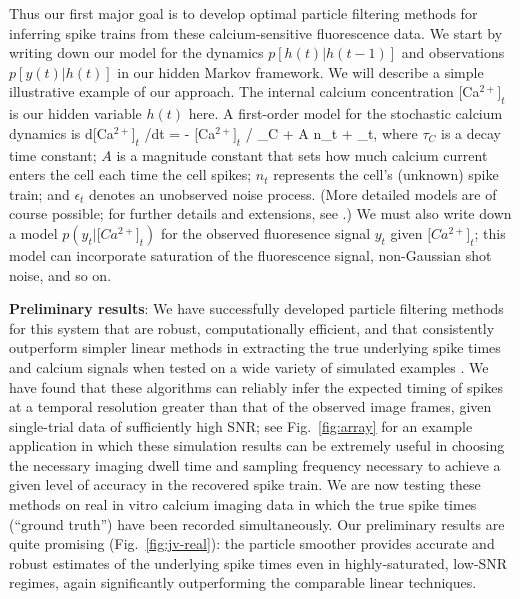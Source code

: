 \documentclass[12pt]{article}
\newcommand{\Cat}{[Ca\ensuremath{^{2+}]_t} }
\begin{document}
Thus our first major goal is to develop optimal particle filtering
methods for inferring spike trains from these calcium-sensitive
fluorescence data.  We start by writing down our model for the
dynamics $p[h(t)|h(t-1)]$ and observations $p[y(t)|h(t)]$ in our
hidden Markov framework.  We will describe a simple illustrative
example of our approach.  The internal calcium concentration \Cat is
our hidden variable $h(t)$ here.  A first-order model for the
stochastic calcium dynamics is \eq d\Cat /dt = - \Cat / \tau_C + A n_t
+ \epsilon_t, \en where $\tau_C$ is a decay time constant; $A$ is a
magnitude constant that sets how much calcium current enters the cell
each time the cell spikes; $n_t$ represents the cell's (unknown) spike
train; and $\epsilon_t$ denotes an unobserved noise process.  (More
detailed models are of course possible; for further details and
extensions, see \cite{Vogelstein07}.)  We must also write down a model
$p(y_t | \Cat)$ for the observed fluoresence signal $y_t$ given
$\Cat$; this model can incorporate saturation of the fluorescence
signal, non-Gaussian shot noise, and so on.

\noindent \textbf{Preliminary results}: We have successfully developed
particle filtering methods for this system that are robust,
computationally efficient, and that consistently outperform simpler
linear methods in extracting the true underlying spike times and
calcium signals when tested on a wide variety of simulated examples
\cite{Vogelstein07}.  We have found that these algorithms can reliably
infer the expected timing of spikes at a temporal resolution greater
than that of the observed image frames, given single-trial data of
sufficiently high SNR; see Fig.~\ref{fig:array} for an example
application in which these simulation results can be extremely useful
in choosing the necessary imaging dwell time and sampling frequency
necessary to achieve a given level of accuracy in the recovered spike
train.  We are now testing these methods on real in vitro calcium
imaging data in which the true spike times (``ground truth'') have
been recorded simultaneously.  Our preliminary results are quite
promising (Fig.~\ref{fig:jv-real}): the particle smoother provides
accurate and robust estimates of the underlying spike times even in
highly-saturated, low-SNR regimes, again significantly outperforming
the comparable linear techniques.
\end{document}
